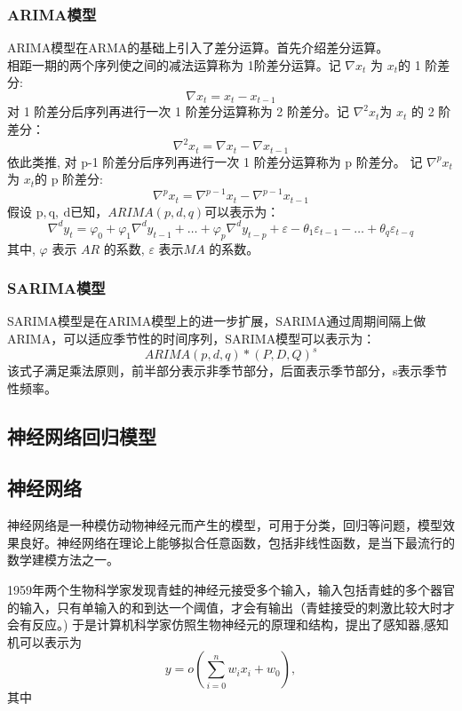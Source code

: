 		\subsubsection{ARIMA模型}
		ARIMA模型在ARMA的基础上引入了差分运算。首先介绍差分运算。\cite{book3}
		\\
		相距一期的两个序列使之间的减法运算称为 1阶差分运算。记 $ \nabla x_{t} $ 为  $x_{t}  $的 1 阶差分:
	$$	\nabla x_{t}=x_{t}-x_{t-1}$$
		对 1 阶差分后序列再进行一次 1 阶差分运算称为 2 阶差分。记 $ \nabla^{2} x_{t}  $为  $x_{t} $ 的 2 阶差分：
	$$	\nabla^{2} x_{t}=\nabla x_{t}-\nabla x_{t-1}$$
		依此类推, 对  p-1  阶差分后序列再进行一次 1 阶差分运算称为  p  阶差分。 记  $\nabla^{p} x_{t} $ 为 $ x_{t}  $的  p  阶差分:
	$$	\nabla^{p} x_{t}=\nabla^{p-1} x_{t}-\nabla^{p-1} x_{t-1}$$
	假设 $ \mathrm{p} , \mathrm{q} ,\mathrm{~d}  $已知，$ARIMA(p,d,q)$可以表示为：
	$$\nabla^{d} y_{t} =\varphi_{0}+\varphi_{1} \nabla^{d} y_{t-1}+\ldots+\varphi_{p}  \nabla^{d} y_{t-p}+\varepsilon-\theta_{1}  \varepsilon_{t-1}-\ldots+\theta_{q}  \varepsilon_{t-q}$$
	其中,  $\varphi $ 表示 $ AR $ 的系数,  $\varepsilon $ 表示$  MA$  的系数。
		\subsubsection{SARIMA模型}
		SARIMA模型是在ARIMA模型上的进一步扩展，SARIMA通过周期间隔上做ARIMA，可以适应季节性的时间序列，SARIMA模型可以表示为：
 $$ARIMA(p, d, q) * (P, D, Q)^s $$该式子满足乘法原则，前半部分表示非季节部分，后面表示季节部分，s表示季节性频率。
	\subsection{神经网络回归模型}
	\subsection{神经网络}
	神经网络是一种模仿动物神经元而产生的模型，可用于分类，回归等问题，模型效果良好。神经网络在理论上能够拟合任意函数，包括非线性函数，是当下最流行的数学建模方法之一。
	
	1959年两个生物科学家发现青蛙的神经元接受多个输入，输入包括青蛙的多个器官的输入，只有单输入的和到达一个阈值，才会有输出（青蛙接受的刺激比较大时才会有反应。)
	于是计算机科学家仿照生物神经元的原理和结构，提出了感知器,感知机可以表示为$$y=o(\sum_{i=0}^{n} w_{i} x_{i}+w_0),$$其中
	

